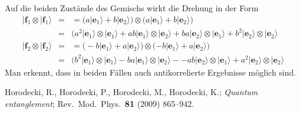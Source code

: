 Auf die beiden Zust\"ande des Gemischs wirkt die Drehung in der Form
\begin{eqnarray}
    | \pmb{f}_1 \otimes |\pmb{f}_1\rangle &=&
    = \big( a | \pmb{e}_1 \rangle + b |\pmb{e}_2 \rangle \big) \otimes
                     ( a | \pmb{e}_1 \rangle + b |\pmb{e}_2 \rangle \big)  \\
    &=& \big( a^2 | \pmb{e}_1 \rangle \otimes | \pmb{e}_1 \rangle + ab | \pmb{e}_1 \rangle \otimes | \pmb{e}_2 \rangle +
                   ba | \pmb{e}_2 \rangle \otimes | \pmb{e}_1 \rangle + b^2 | \pmb{e}_2 \rangle \otimes | \pmb{e}_2 \rangle  \\
    | \pmb{f}_2 \otimes |\pmb{f}_2\rangle &=&
    = \big( -b | \pmb{e}_1 \rangle + a |\pmb{e}_2 \rangle \big) \otimes
                     ( -b | \pmb{e}_1 \rangle + a |\pmb{e}_2 \rangle \big)  \\
    &=& \big( b^2 |\pmb{e}_1 \rangle \otimes | \pmb{e}_1 \rangle - ba |\pmb{e}_1 \rangle \otimes |\pmb{e}_2 \rangle -
                   -ab | \pmb{e}_2 \rangle \otimes | \pmb{e}_1 \rangle + a^2 |\pmb{e}_2 \rangle \otimes |\pmb{e}_2 \rangle  
\end{eqnarray}
Man erkennt, dass in beiden F\"allen auch antikorrelierte Ergebnisse m\"oglich sind.

\begin{thebibliography}{99}
 Horodecki, R., Horodecki, P., Horodecki, M.,
         Horodecki, K.; {\em Quantum entanglement}; Rev.\ Mod.\ Phys.\ {\bf 81}
         (2009) 865--942.       
\end{thebibliography}


%

